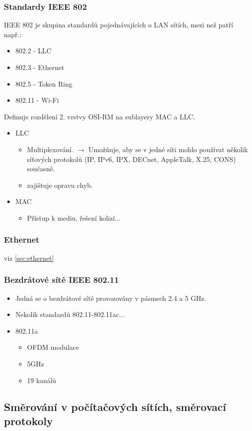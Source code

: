 \documentclass[10pt,a4paper]{article}
\begin{document}
\subsubsection{Standardy IEEE 802}
IEEE 802 je skupina standardů pojednávajících o LAN sítích, mezi než patří např.:
\begin{itemize}
\item 802.2 - LLC
\item 802.3 - Ethernet
\item 802.5 - Token Ring
\item 802.11 - Wi-Fi
\end{itemize}
Definuje rozdělení 2. vrstvy OSI-RM na sublayery MAC a LLC.
\begin{itemize}
\item LLC
\begin{itemize}
\item Multiplexování. $\rightarrow$ Umožňuje, aby se v jedné síti mohlo používat několik síťových protokolů (IP, IPv6, IPX, DECnet, AppleTalk, X.25, CONS) současně.
\item zajištuje opravu chyb.
\end{itemize}
\item MAC
\begin{itemize}
\item Přístup k mediu, řešení kolizí...
\end{itemize}
\end{itemize}
\subsubsection{Ethernet} 
viz \ref{sec:ethernet}
\subsubsection{Bezdrátové sítě IEEE 802.11}
\begin{itemize}
\item Jedná se o bezdrátové sítě provozovány v pásmech 2.4 a 5 GHz.
\item Nekolik standardů 802.11-802.11ac...
\item 802.11a
\begin{itemize}
\item OFDM modulace
\item 5GHz
\item 19 kanálů
\end{itemize}
\end{itemize}
\subsection{Směrování v počítačových sítích, směrovací protokoly}
\end{document}
